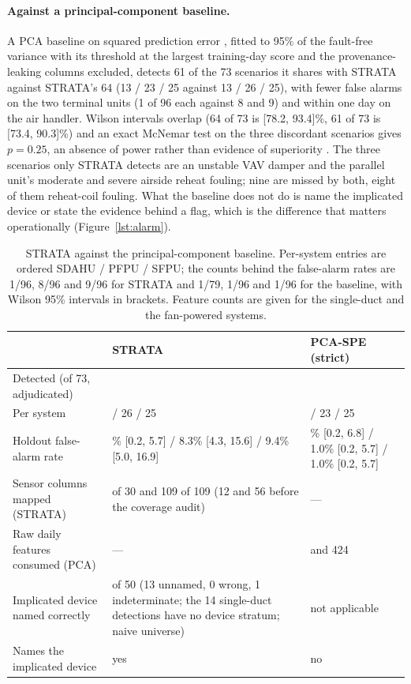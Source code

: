 \documentclass[11pt,letterpaper]{article}
\begin{document}
\paragraph{Against a principal-component baseline.} A PCA baseline on squared prediction error \cite{wang2004pcaahu}, fitted to 95\% of the fault-free variance with its threshold at the largest training-day score and the provenance-leaking columns excluded, detects 61 of the 73 scenarios it shares with STRATA against STRATA's 64 (13 / 23 / 25 against 13 / 26 / 25), with fewer false alarms on the two terminal units (1 of 96 each against 8 and 9) and within one day on the air handler. Wilson intervals overlap (64 of 73 is [78.2, 93.4]\%, 61 of 73 is [73.4, 90.3]\%) and an exact McNemar test on the three discordant scenarios gives $p = 0.25$, an absence of power rather than evidence of superiority \cite{wilson1927interval,mcnemar1947test}. The three scenarios only STRATA detects are an unstable VAV damper and the parallel unit's moderate and severe airside reheat fouling; nine are missed by both, eight of them reheat-coil fouling. What the baseline does not do is name the implicated device or state the evidence behind a flag, which is the difference that matters operationally (Figure~\ref{lst:alarm}).

\begin{table}[htbp]
\centering
\caption{STRATA against the principal-component baseline. Per-system entries are ordered SDAHU / PFPU / SFPU; the counts behind the false-alarm rates are 1/96, 8/96 and 9/96 for STRATA and 1/79, 1/96 and 1/96 for the baseline, with Wilson 95\% intervals \cite{wilson1927interval} in brackets. Feature counts are given for the single-duct and the fan-powered systems.}
\label{tab:pca}
\small
\setlength{\tabcolsep}{5pt}
\renewcommand{\arraystretch}{1.15}
\begin{tabular}{@{}>{\raggedright\arraybackslash}p{}>{\raggedright\arraybackslash}p{}>{\raggedright\arraybackslash}p{}@{}}
\hline
 & STRATA & PCA-SPE (strict) \\
\hline
Detected (of 73, adjudicated) & 64 & 61 \\
Per system & 13 / 26 / 25 & 13 / 23 / 25 \\
Holdout false-alarm rate & 1.0\% [0.2, 5.7] / 8.3\% [4.3, 15.6] / 9.4\% [5.0, 16.9] & 1.3\% [0.2, 6.8] / 1.0\% [0.2, 5.7] / 1.0\% [0.2, 5.7] \\
Sensor columns mapped (STRATA) & 26 of 30 and 109 of 109 (12 and 56 before the coverage audit) & --- \\
Raw daily features consumed (PCA) & --- & 108 and 424 \\
Implicated device named correctly & 37 of 50 (13 unnamed, 0 wrong, 1 indeterminate; the 14 single-duct detections have no device stratum; naive universe) & not applicable \\
Names the implicated device & yes & no \\
\hline
\end{tabular}

\end{table}
\end{document}
